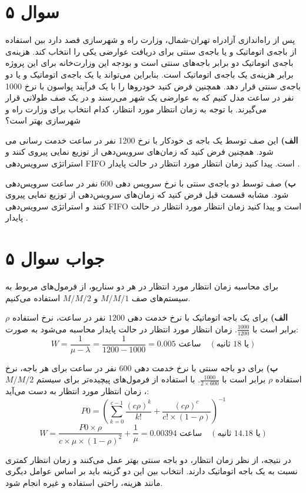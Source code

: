 \section*{سوال ۵}

پس از راه‌اندازی آزادراه تهران-شمال، وزارت راه و شهرسازی قصد دارد بین استفاده از باجه‌ی اتوماتیک و یا باجه‌ی سنتی برای دریافت عوارضی یکی را انتخاب کند. هزینه‌ی باجه‌ی اتوماتیک دو برابر باجه‌های سنتی است و بودجه این وزارت‌خانه برای این پروژه برابر هزینه‌ی یک باجه‌ی اتوماتیک است. بنابراین می‌تواند یا یک باجه‌ی اتوماتیک و یا دو باجه‌ی سنتی قرار دهد. همچنین فرض کنید خودروها را با یک فرآیند پواسون با نرخ 1000 نفر در ساعت مدل کنیم که به عوارضی یک شهر می‌رسند و در یک صف طولانی قرار می‌گیرند. با توجه به زمان انتظار مورد انتظار، کدام انتخاب برای وزارت راه و شهرسازی بهتر است؟

\textbf{الف)}
این صف توسط یک باجه ی خودکار با نرخ 1200 نفر در ساعت خدمت رسانی می شود. همچنین فرض کنید که زمان‌های سرویس‌دهی از توزیع نمایی پیروی کنند و استراتژی سرویس‌دهی FIFO است. پیدا کنید زمان انتظار مورد انتظار در حالت پایدار 
.

\textbf{ب)}
صف توسط دو باجه‌ی سنتی با نرخ سرویس دهی 600 نفر در ساعت سرویس‌دهی شود. مشابه قسمت قبل فرض کنید که زمان‌های سرویس‌دهی از توزیع نمایی پیروی کنند و استراتژی سرویس‌دهی FIFO است و پیدا کنید زمان انتظار مورد انتظار در حالت پایدار 
.

\section*{جواب سوال ۵}


برای محاسبه زمان انتظار مورد انتظار در هر دو سناریو، از فرمول‌های مربوط به سیستم‌های صف \(M/M/1\) و \(M/M/2\) استفاده می‌کنیم.

\textbf{الف)} برای یک باجه اتوماتیک با نرخ خدمت دهی \(1200\) نفر در ساعت، نرخ استفاده \(\rho\) برابر است با \(\frac{1000}{1200}\). زمان انتظار مورد انتظار در حالت پایدار محاسبه می‌شود به صورت:
\[
W = \frac{1}{\mu - \lambda} = \frac{1}{1200 - 1000} = 0.005 \text{ ساعت} \quad (\text{یا 18 ثانیه})
\]

\textbf{ب)} برای دو باجه سنتی با نرخ خدمت دهی \(600\) نفر در ساعت برای هر باجه، نرخ استفاده \(\rho\) برابر است با \(\frac{1000}{2 \times 600}\). با استفاده از فرمول‌های پیچیده‌تر برای سیستم \(M/M/2\)، زمان انتظار مورد انتظار به دست می‌آید:
\[
P0 = \left( \sum_{k=0}^{c-1} \frac{(c\rho)^k}{k!} + \frac{(c\rho)^c}{c! \times (1-\rho)} \right)^{-1}
\]
\[
W = \frac{P0 \times \rho}{c \times \mu \times (1 - \rho)^2} + \frac{1}{\mu} = 0.00394 \text{ ساعت} \quad (\text{یا 14.18 ثانیه})
\]

در نتیجه، از نظر زمان انتظار، دو باجه سنتی بهتر عمل می‌کنند و زمان انتظار کمتری نسبت به یک باجه اتوماتیک دارند. انتخاب بین این دو گزینه باید بر اساس عوامل دیگری مانند هزینه، راحتی استفاده و غیره انجام شود.